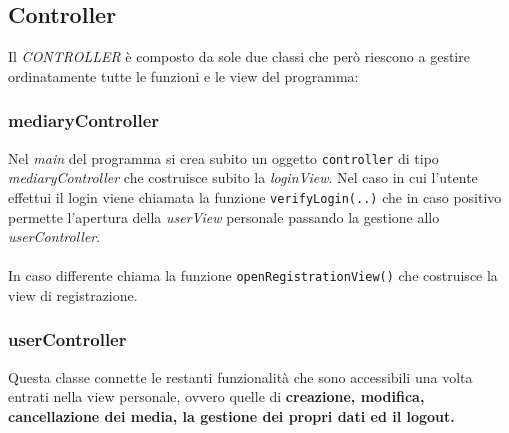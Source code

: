 \documentclass[10pt,a4paper,openany]{article}
\begin{document}
	\newpage
	
		\subsection{Controller}
		
		Il \emph{CONTROLLER} è composto da sole due classi che però riescono a gestire ordinatamente tutte le funzioni e le view del programma:
		
			\subsubsection{mediaryController}
			
			Nel \emph{main} del programma si crea subito un oggetto \texttt{controller} di tipo \emph{mediaryController} che costruisce subito la 
			\emph{loginView}.
			Nel caso in cui l'utente effettui il login viene chiamata la funzione \texttt{verifyLogin(..)} che in caso positivo permette l'apertura della \emph{userView}
			personale passando la gestione allo \emph{userController}.\\\\
			In caso differente chiama la funzione \texttt{openRegistrationView()} che costruisce la view di registrazione.
			
			\subsubsection{userController}
			
			Questa classe connette le restanti funzionalità che sono accessibili una volta entrati nella view personale, ovvero quelle di \textbf{creazione, modifica, 
			cancellazione dei media, la gestione dei propri dati ed il logout.}
			








	





\end{document}
